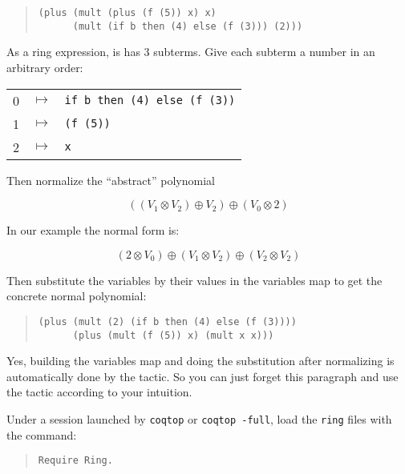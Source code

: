 \begin{quotation}
\begin{verbatim}
(plus (mult (plus (f (5)) x) x)
      (mult (if b then (4) else (f (3))) (2)))
\end{verbatim}
\end{quotation}

\noindent As a ring expression, is has 3 subterms. Give each subterm a
number in an arbitrary order:

\begin{tabular}{ccl}
0 & $\mapsto$ & \verb|if b then (4) else (f (3))| \\
1 & $\mapsto$ & \verb|(f (5))| \\
2 & $\mapsto$ & \verb|x| \\
\end{tabular}

\noindent Then normalize the ``abstract'' polynomial 

$$((V_1 \otimes V_2) \oplus V_2) \oplus (V_0 \otimes 2) $$

\noindent In our example the normal form is:

$$(2 \otimes V_0) \oplus (V_1 \otimes V_2) \oplus (V_2 \otimes V_2)$$

\noindent Then substitute the variables by their values in the variables map to
get the concrete normal polynomial:

\begin{quotation}
\begin{verbatim}
(plus (mult (2) (if b then (4) else (f (3)))) 
      (plus (mult (f (5)) x) (mult x x))) 
\end{verbatim}
\end{quotation}


Yes, building the variables map and doing the substitution after
normalizing is automatically done by the tactic. So you can just forget
this paragraph and use the tactic according to your intuition.


Under a session launched by \texttt{coqtop} or \texttt{coqtop -full},
load the \texttt{ring} files with the command:

\begin{quotation}
\begin{verbatim}
Require Ring.
\end{verbatim}
\end{quotation}

